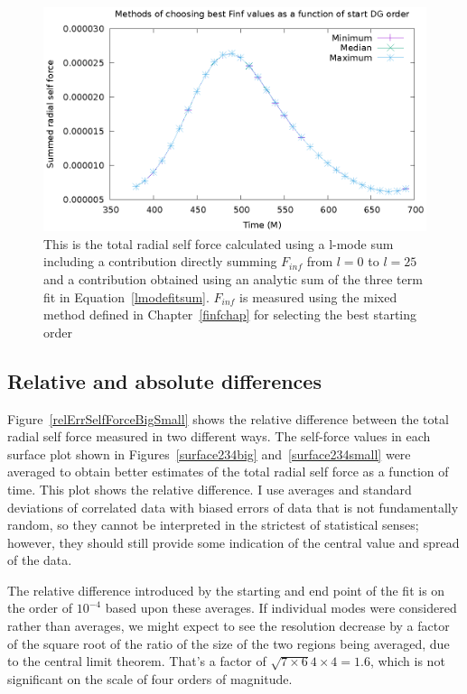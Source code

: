 \begin{figure}
  \includegraphics{bestfinfscriptplot.eps}
  \caption{This is the total radial self force calculated using a l-mode sum including a contribution directly summing $F_{inf}$ from $l=0$ to $l=25$ and a contribution obtained using an analytic sum of the three term fit in Equation~\ref{lmodefitsum}. $F_{inf}$ is measured using the mixed method defined in Chapter~\ref{finfchap} for selecting the best starting order}
\label{totalselfforcevt2}
\end{figure}


\subsection{Relative and absolute differences}

Figure~\ref{relErrSelfForceBigSmall} shows the relative difference between the total radial self force measured in two different ways. The self-force values in each surface plot shown in Figures~\ref{surface234big} and~\ref{surface234small} were averaged to obtain better estimates of the total radial self force as a function of time. This plot shows the relative difference. I use averages and standard deviations of correlated data with biased errors of data that is not fundamentally random, so they cannot be interpreted in the strictest of statistical senses; however, they should still provide some indication of the central value and spread of the data.

The relative difference introduced by the starting and end point of the fit is on the order of $10^{-4}$ based upon these averages. If individual modes were considered rather than averages, we might expect to see the resolution decrease by a factor of the square root of the ratio of the size of the two regions being averaged, due to the central limit theorem. That's a factor of $\sqrt{7\times 6}{4\times 4}=1.6$, which is not significant on the scale of four orders of magnitude. 


